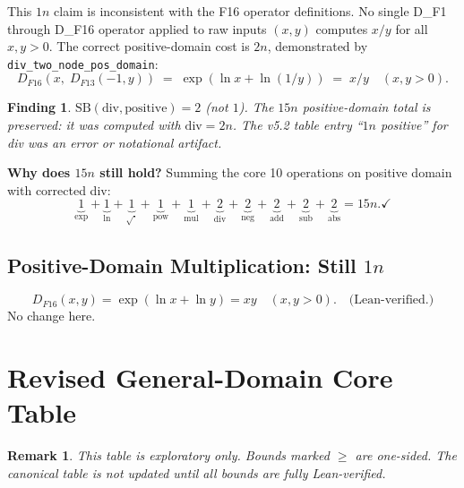\documentclass[11pt]{article}
\newtheorem{remark}[theorem]{Remark}
\newtheorem{finding}[theorem]{Finding}
\newcommand{\ok}[1]{\textcolor{correct}{#1}}
\newcommand{\bad}[1]{\textcolor{flagged}{#1}}
\begin{document}
\noindent This $1n$ claim is \bad{inconsistent} with the F16 operator definitions.
No single D\_F1 through D\_F16 operator applied to raw inputs $(x,y)$ computes $x/y$ for all $x,y > 0$.
The correct positive-domain cost is $2n$, demonstrated by \texttt{div\_two\_node\_pos\_domain}:
\[
D_{F16}(x,\; D_{F13}(-1,y)) \;=\; \exp(\ln x + \ln(1/y)) \;=\; x/y \quad (x,y > 0).
\]

\begin{finding}
$\mathrm{SB}(\mathrm{div},\text{positive}) = 2$ (not $1$).
The $15n$ positive-domain total is \ok{preserved}: it was computed with $\mathrm{div} = 2n$.
The v5.2 table entry ``$1n$ positive'' for div was an error or notational artifact.
\end{finding}

\noindent\textbf{Why does $15n$ still hold?}
Summing the core 10 operations on positive domain with corrected div:
\[
\underbrace{1}_{\exp} + \underbrace{1}_{\ln} + \underbrace{1}_{\sqrt{\cdot}} + \underbrace{1}_{\mathrm{pow}} + \underbrace{1}_{\mathrm{mul}} + \underbrace{2}_{\mathrm{div}} + \underbrace{2}_{\mathrm{neg}} + \underbrace{2}_{\mathrm{add}} + \underbrace{2}_{\mathrm{sub}} + \underbrace{2}_{\mathrm{abs}} = 15n. \checkmark
\]

\subsection{Positive-Domain Multiplication: Still $1n$}
\[
D_{F16}(x,y) = \exp(\ln x + \ln y) = xy \quad (x,y > 0). \quad\text{(Lean-verified.)}
\]
No change here.

\section{Revised General-Domain Core Table}

\begin{remark}
This table is \emph{exploratory only}. Bounds marked $\geq$ are one-sided.
The canonical table is not updated until all bounds are fully Lean-verified.
\end{remark}
\end{document}
